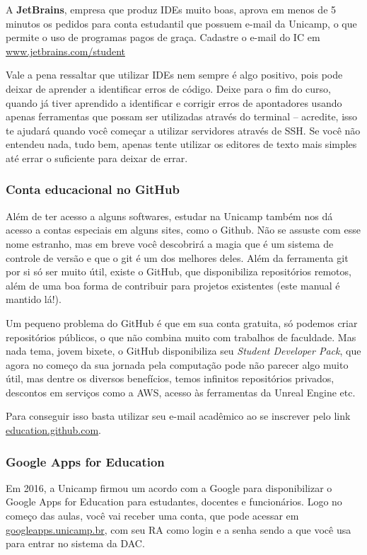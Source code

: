 A \textbf{JetBrains}, empresa que produz IDEs muito boas, aprova em menos de 5
minutos os pedidos para conta estudantil que possuem e-mail da Unicamp, o que
permite o uso de programas pagos de graça. Cadastre o e-mail do IC em
\url{www.jetbrains.com/student}

Vale a pena ressaltar que utilizar IDEs nem sempre é algo positivo, pois pode
deixar de aprender a identificar erros de código. Deixe para o fim do curso,
quando já tiver aprendido a identificar e corrigir erros de apontadores usando
apenas ferramentas que possam ser utilizadas através do terminal -- acredite,
isso te ajudará quando você começar a utilizar servidores através de SSH.
Se você não entendeu nada, tudo bem, apenas tente utilizar os editores de texto
mais simples até errar o suficiente para deixar de errar.

\subsubsection{Conta educacional no GitHub}

Além de ter acesso a alguns softwares, estudar na Unicamp também nos dá acesso
a contas especiais em alguns sites, como o Github. Não se assuste com esse nome
estranho, mas em breve você descobrirá a magia que é um sistema de controle de
versão e que o git é um dos melhores deles. Além da ferramenta git por si só
ser muito útil, existe o GitHub, que disponibiliza repositórios remotos, além
de uma boa forma de contribuir para projetos existentes (este manual é mantido
lá!).

Um pequeno problema do GitHub é que em sua conta gratuita, só podemos criar
repositórios públicos, o que não combina muito com trabalhos de faculdade. Mas
nada tema, jovem bixete, o GitHub disponibiliza seu \emph{Student Developer
Pack}, que agora no começo da sua jornada pela computação pode não parecer algo
muito útil, mas dentre os diversos benefícios, temos infinitos repositórios
privados, descontos em serviços como a AWS, acesso às ferramentas da Unreal
Engine etc.

Para conseguir isso basta utilizar seu e-mail acadêmico ao se inscrever pelo
link \url{education.github.com}.

\subsubsection{Google Apps for Education}

Em 2016, a Unicamp firmou um acordo com a Google para disponibilizar o Google
Apps for Education para estudantes, docentes e funcionários. Logo no começo das
aulas, você vai receber uma conta, que pode acessar em
\url{googleapps.unicamp.br}, com seu RA como login e a senha sendo a que você
usa para entrar no sistema da DAC.

